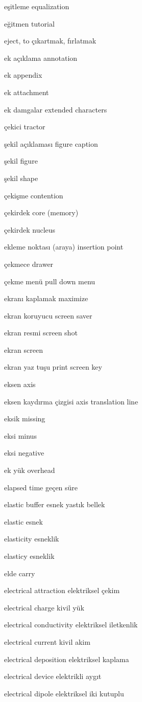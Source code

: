\documentclass[12pt,fleqn]{article}\usepackage{../../common}
\begin{document}
eşitleme equalization

eğitmen tutorial

eject, to çıkartmak, fırlatmak

ek açıklama annotation

ek appendix

ek attachment

ek damgalar extended characters

çekici tractor

şekil açıklaması figure caption

şekil figure

şekil shape

çekişme contention

çekirdek core (memory)

çekirdek nucleus

ekleme noktası (araya) insertion point

çekmece drawer

çekme menü pull down menu

ekranı kaplamak maximize

ekran koruyucu screen saver

ekran resmi screen shot

ekran screen

ekran yaz tuşu print screen key

eksen axis

eksen kaydırma çizgisi axis translation line

eksik missing

eksi minus

eksi negative

ek yük overhead

elapsed time geçen süre

elastic buffer esnek yastık bellek

elastic esnek

elasticity esneklik

elasticy esneklik

elde carry

electrical attraction elektriksel çekim

electrical charge kivil yük

electrical conductivity elektriksel iletkenlik

electrical current kivil akim

electrical deposition elektriksel kaplama

electrical device elektrikli aygıt

electrical dipole elektriksel iki kutuplu
\end{document}
